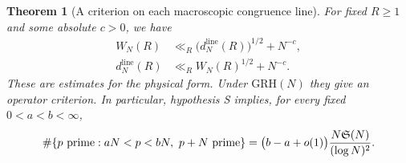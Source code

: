 \documentclass[11pt,a4paper]{article}
\numberwithin{equation}{section}
\newtheorem{theorem}{Theorem}[section]
\newcommand{\SSS}{\mathfrak S}
\newcommand{\grh}{\mathrm{GRH}}
\begin{document}
\begin{theorem}[A criterion on each macroscopic congruence line]
\label{thm:macroscopiclines}
For fixed $R\ge1$ and some absolute $c>0$, we have
\begin{align*}
 W_N(R)&\ll_R \bigl(d_N^{\mathrm{line}}(R)\bigr)^{1/2}+N^{-c},\\
 d_N^{\mathrm{line}}(R)&\ll_R W_N(R)^{1/2}+N^{-c}.
\end{align*}
These are estimates for the physical form. Under $\grh(N)$
they give an operator criterion. In particular, hypothesis S
implies, for every fixed $0<a<b<\infty$,
\begin{equation}
  \#\{p\ {\rm prime}:aN<p<bN,\ p+N\ {\rm prime}\}
   =\bigl(b-a+o(1)\bigr)\frac{N\SSS(N)}{(\log N)^2}.
 \label{eq:macroscopicdifference}
\end{equation}
\end{theorem}
\end{document}

